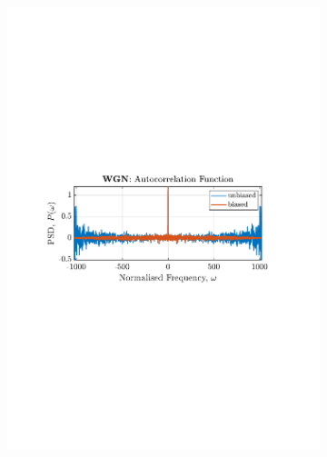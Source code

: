\documentclass[12pt]{article}
\begin{document}
	\begin{figure}[H]
		\centering
		\begin{subfigure}{0.49\textwidth}
			\centering
			\includegraphics[trim={2.2cm 11cm 3.15cm  11.2cm}, clip, width=\textwidth]{../MATLAB/figures/q1_3a_fig01.pdf} 
		\end{subfigure}
		\begin{subfigure}{0.49\textwidth}
			\centering

\end{subfigure}
\end{figure}
\end{document}
